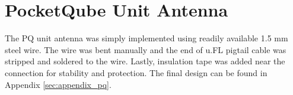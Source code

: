 \section{PocketQube Unit Antenna}

The PQ unit antenna was simply implemented using readily available 1.5 mm steel wire. The wire was bent manually and the end of u.FL pigtail cable was stripped and soldered to the wire. Lastly, insulation tape was added near the connection for stability and protection. The final design can be found in Appendix \ref{sec:appendix_pq}.